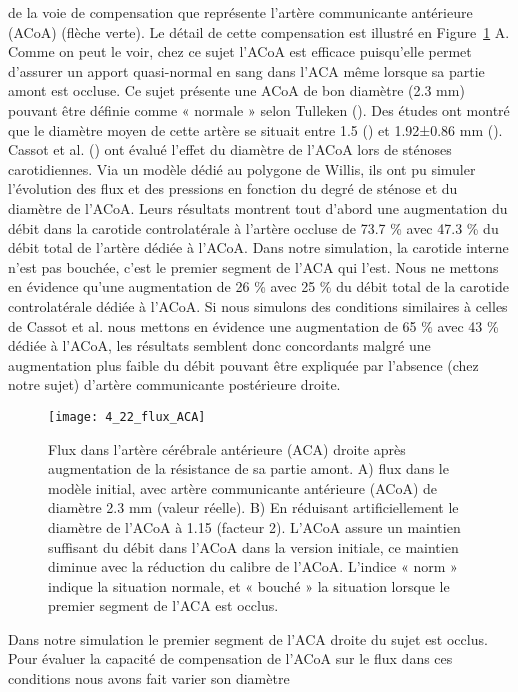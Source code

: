 de la voie de compensation que représente l’artère communicante antérieure (ACoA) (flèche verte).
Le détail de cette compensation est illustré en Figure~\ref{fig:4_22_flux_ACA} A. Comme on peut le voir, chez ce sujet l’ACoA
est efficace puisqu’elle permet d’assurer un apport quasi-normal en sang dans l’ACA même lorsque sa
partie amont est occluse. Ce sujet présente une ACoA de bon diamètre (2.3 mm) pouvant être définie
comme « normale » selon Tulleken (\cite{Tulleken1978}). Des études ont montré que le diamètre moyen de cette
artère se situait entre 1.5 (\cite{Perlmutter1976}) et 1.92±0.86 mm (\cite{Hillen1986}). Cassot et al. (\cite{Cassot1995}) ont évalué l’effet du diamètre
de l’ACoA lors de sténoses carotidiennes. Via un modèle dédié au polygone de Willis, ils ont pu simuler
l’évolution des flux et des pressions en fonction du degré de sténose et du diamètre de l’ACoA. Leurs
résultats montrent tout d’abord une augmentation du débit dans la carotide controlatérale à l’artère
occluse de 73.7 \% avec 47.3 \% du débit total de l’artère dédiée à l’ACoA. Dans notre simulation, la
carotide interne n’est pas bouchée, c’est le premier segment de l’ACA qui l’est. Nous ne mettons en
évidence qu’une augmentation de 26 \% avec 25 \% du débit total de la carotide controlatérale dédiée
à l’ACoA. Si nous simulons des conditions similaires à celles de Cassot et al. nous mettons en évidence
une augmentation de 65 \% avec 43 \% dédiée à l’ACoA, les résultats semblent donc concordants malgré
une augmentation plus faible du débit pouvant être expliquée par l’absence (chez notre sujet) d’artère
communicante postérieure droite.\\
\begin{figure}[!t]
\centering
\texttt{[image: 4\_22\_flux\_ACA]}
\caption{ Flux dans l'artère cérébrale antérieure (ACA) droite après augmentation de la résistance de sa partie amont. A)
flux dans le modèle initial, avec artère communicante antérieure (ACoA) de diamètre 2.3 mm (valeur réelle). B) En réduisant
artificiellement le diamètre de l’ACoA à 1.15 (facteur 2). L’ACoA assure un maintien suffisant du débit dans l’ACoA dans la
version initiale, ce maintien diminue avec la réduction du calibre de l’ACoA. L’indice « norm » indique la situation normale, et
« bouché » la situation lorsque le premier segment de l’ACA est occlus.}
\label{fig:4_22_flux_ACA}	
\end{figure}
Dans notre simulation le premier segment de l’ACA droite du sujet est occlus. Pour évaluer la
capacité de compensation de l’ACoA sur le flux dans ces conditions nous avons fait varier son diamètre
